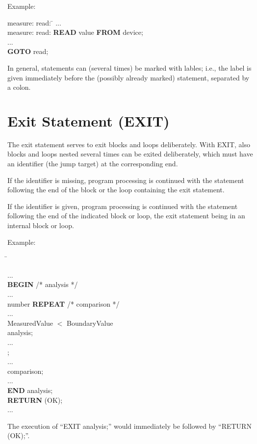 Example:

\begin{tabbing}
measure: read: \= \kill
        \> ...\\
measure: read: \> {\bf READ} value {\bf FROM} device;\\
        \> ... \\
        \> {\bf GOTO} read;
\end{tabbing}

In general, statements can (several times) be marked with lables; i.e.,
the label is given immediately before the (possibly already marked)
statement, separated by a colon.


\section{Exit Statement (EXIT)}    %
\label{sec_exit}

The exit statement serves to exit blocks and loops deliberately. With
EXIT, also blocks and loops nested several times can be exited
deliberately, which must have an identifier (the jump target) at the
corresponding end.



If the identifier is missing, program processing is continued with the
statement following the end of the block or the loop containing the exit
statement.

If the identifier is given, program processing is continued with the
statement following the end of the indicated block or loop, the exit
statement being in an internal block or loop.


Example:

\begin{tabbing}
\hspace*{7cm} \= \kill

... \> \\
{\bf BEGIN} \> /* analysis */ \\
\x ... \> \\
 number {\bf REPEAT} \> /* comparison */ \\
\x \x ... \> \\
\x {} MeasuredValue $<$ BoundaryValue \> \\
\x {} analysis; \> \\
\x {} ... \> \\
\x {}; \> \\
\x \x ... \> \\
 comparison; \> \\
\x ... \> \\
{\bf END} analysis; \> \\
{\bf RETURN} (OK);\> \\
\x ... \>
\end{tabbing}

The execution of ``EXIT analysis;'' would immediately be followed by
``RETURN (OK);''.

